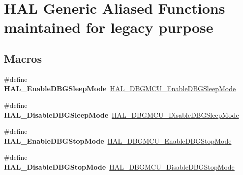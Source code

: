 \hypertarget{group___h_a_l___aliased___functions}{}\section{H\+AL Generic Aliased Functions maintained for legacy purpose}
\label{group___h_a_l___aliased___functions}
\subsection*{Macros}
\begin{DoxyCompactItemize}
\item 
\mbox{\label{group___h_a_l___aliased___functions_ga334dab724209d848427632878cd18590}} 
\#define {\bfseries H\+A\+L\+\_\+\+Enable\+D\+B\+G\+Sleep\+Mode}~\mbox{\hyperlink{group___h_a_l___exported___functions___group2_gaf031bcc71ebad9b7edf405547efd762b}{H\+A\+L\+\_\+\+D\+B\+G\+M\+C\+U\+\_\+\+Enable\+D\+B\+G\+Sleep\+Mode}}
\item 
\mbox{\label{group___h_a_l___aliased___functions_gadd190a639a43b5aa49cf3d773d6e877f}} 
\#define {\bfseries H\+A\+L\+\_\+\+Disable\+D\+B\+G\+Sleep\+Mode}~\mbox{\hyperlink{group___h_a_l___exported___functions___group2_gac7820d0561f19999a68d714655b901b5}{H\+A\+L\+\_\+\+D\+B\+G\+M\+C\+U\+\_\+\+Disable\+D\+B\+G\+Sleep\+Mode}}
\item 
\mbox{\label{group___h_a_l___aliased___functions_ga5d8db04085885e06f167cb9e901bb729}} 
\#define {\bfseries H\+A\+L\+\_\+\+Enable\+D\+B\+G\+Stop\+Mode}~\mbox{\hyperlink{group___h_a_l___exported___functions___group2_gadf25043b17de4bef38a95a75fd03e5c4}{H\+A\+L\+\_\+\+D\+B\+G\+M\+C\+U\+\_\+\+Enable\+D\+B\+G\+Stop\+Mode}}
\item 
\mbox{\label{group___h_a_l___aliased___functions_gaca227f80c71d94c0880bd681d68deb85}} 
\#define {\bfseries H\+A\+L\+\_\+\+Disable\+D\+B\+G\+Stop\+Mode}~\mbox{\hyperlink{group___h_a_l___exported___functions___group2_ga2c93dcee35e5983d74f1000de7c042d5}{H\+A\+L\+\_\+\+D\+B\+G\+M\+C\+U\+\_\+\+Disable\+D\+B\+G\+Stop\+Mode}}
\item 
\mbox{\label{group___h_a_l___aliased___functions_ga829fe0c92393d65bcb65eb8b8f7bdc99}} 

\end{DoxyCompactItemize}
